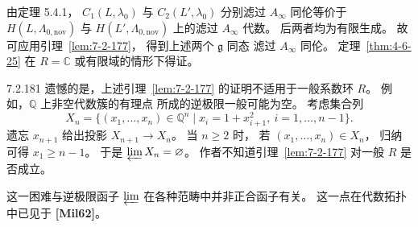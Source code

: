 由定理 5.4.1，
$C_1(L,\lambda_0)$ 与 $C_2(L',\lambda_0)$
分别滤过 $A_\infty$ 同伦等价于
$H(L,\Lambda_{0,\mathrm{nov}})$ 与
$H(L',\Lambda_{0,\mathrm{nov}})$
上的滤过 $A_\infty$ 代数。
后两者均为有限生成。
故可应用引理~\ref{lem:7-2-177}，
得到上述两个 $\mathfrak g$ 同态
滤过 $A_\infty$ 同伦。
定理~\ref{thm:4-6-25}
在 $R=\mathbb C$ 或有限域的情形下得证。

\begin{remark}{7.2.181}\label{rem:7-2-181}
遗憾的是，上述引理~\ref{lem:7-2-177}
的证明不适用于一般系数环 $R$。
例如，$\mathbb Q$ 上非空代数簇的有理点
所成的逆极限一般可能为空。
考虑集合列
\[
X_n=\bigl\{(x_1,\ldots,x_n)\in\mathbb Q^n
\mid x_i=1+x_{i+1}^2,
\ i=1,\ldots,n-1\bigr\}.
\]
遗忘 $x_{n+1}$ 给出投影
$X_{n+1}\to X_n$。
当 $n\ge2$ 时，
若 $(x_1,\ldots,x_n)\in X_n$，
归纳可得 $x_1\ge n-1$。
于是 $\varprojlim X_n=\varnothing$。
作者不知道引理~\ref{lem:7-2-177}
对一般 $R$ 是否成立。

这一困难与逆极限函子 $\varprojlim$
在各种范畴中并非正合函子有关。
这一点在代数拓扑中已见于
\textbf{[Mil62]}。
\end{remark}
